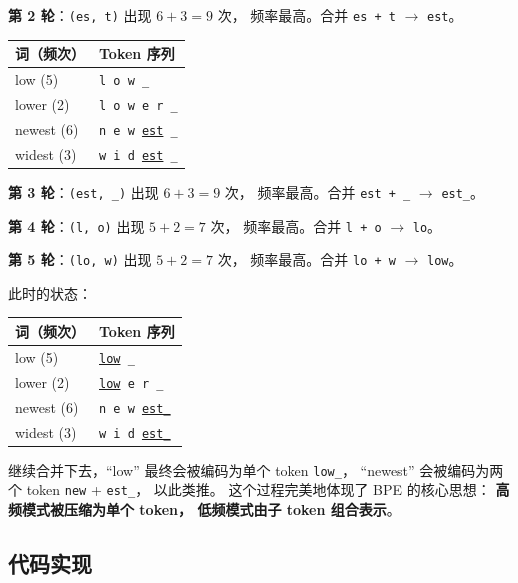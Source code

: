 \textbf{第 2 轮}：\texttt{(es, t)} 出现 $6 + 3 = 9$ 次，
频率最高。合并 \texttt{es + t} $\to$ \texttt{est}。

\begin{center}
\small
\begin{tabular}{ll}
\hline
\textbf{词（频次）} & \textbf{Token 序列} \\
\hline
low (5)    & \texttt{l o w \_} \\
lower (2)  & \texttt{l o w e r \_} \\
newest (6) & \texttt{n e w \underline{est} \_} \\
widest (3) & \texttt{w i d \underline{est} \_} \\
\hline
\end{tabular}
\end{center}

\textbf{第 3 轮}：\texttt{(est, \_)} 出现 $6 + 3 = 9$ 次，
频率最高。合并 \texttt{est + \_} $\to$ \texttt{est\_}。

\textbf{第 4 轮}：\texttt{(l, o)} 出现 $5 + 2 = 7$ 次，
频率最高。合并 \texttt{l + o} $\to$ \texttt{lo}。

\textbf{第 5 轮}：\texttt{(lo, w)} 出现 $5 + 2 = 7$ 次，
频率最高。合并 \texttt{lo + w} $\to$ \texttt{low}。

此时的状态：

\begin{center}
\small
\begin{tabular}{ll}
\hline
\textbf{词（频次）} & \textbf{Token 序列} \\
\hline
low (5)    & \texttt{\underline{low} \_} \\
lower (2)  & \texttt{\underline{low} e r \_} \\
newest (6) & \texttt{n e w \underline{est\_}} \\
widest (3) & \texttt{w i d \underline{est\_}} \\
\hline
\end{tabular}
\end{center}

继续合并下去，``low'' 最终会被编码为单个 token \texttt{low\_}，
``newest'' 会被编码为两个 token \texttt{new} + \texttt{est\_}，
以此类推。
这个过程完美地体现了 BPE 的核心思想：
\textbf{高频模式被压缩为单个 token，
低频模式由子 token 组合表示}。

\subsection{代码实现}

